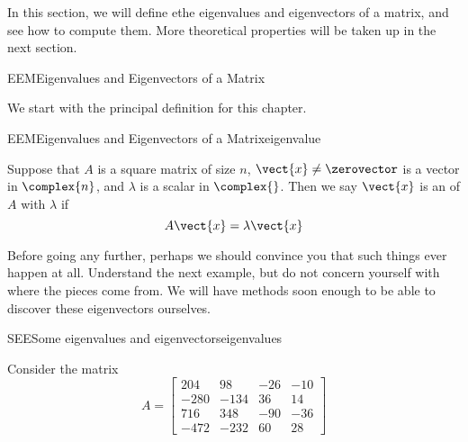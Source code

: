 %
\begin{introduction}
\begin{para}In this section, we will define ethe eigenvalues and eigenvectors of a matrix, and see how to compute them.  More theoretical properties will be taken up in the next section.\end{para}
\end{introduction}
%
\begin{subsect}{EEM}{Eigenvalues and Eigenvectors of a Matrix}
%
\begin{para}We start with the principal definition for this chapter.\end{para}
%
\begin{definition}{EEM}{Eigenvalues and Eigenvectors of a Matrix}{eigenvalue}
\begin{para}Suppose that $A$ is a square matrix of size $n$, $\vect{x}\neq\zerovector$ is a vector in $\complex{n}$, and $\lambda$ is a scalar in $\complex{\null}$.   Then we say $\vect{x}$ is an  of $A$ with  $\lambda$ if
%
\begin{equation*}
A\vect{x}=\lambda\vect{x}
\end{equation*}
\end{para}
%
\end{definition}
%
\begin{para}Before going any further, perhaps we should convince you that such things ever happen at all.  Understand the next example, but do not concern yourself with where the pieces come from.  We will have methods soon enough to be able to discover these eigenvectors ourselves.\end{para}
%
\begin{example}{SEE}{Some eigenvalues and eigenvectors}{eigenvalues}
\begin{para}Consider the matrix
%
\begin{equation*}
A=
\begin{bmatrix}
204 & 98 & -26 & -10\\
-280 & -134 & 36 & 14\\
716 & 348 & -90 & -36\\
-472 & -232 & 60 & 28
\end{bmatrix}

\end{equation*}
\end{para}
\end{example}
\end{subsect}
